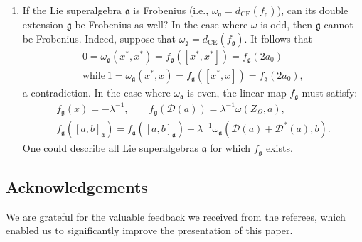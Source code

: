 \documentclass[10pt,a4paper]{amsart}
\numberwithin{equation}{section}
\begin{document}
\begin{enumerate}
 \item[(5)] If the Lie superalgebra $\mathfrak{a}$ is Frobenius (i.e., $\omega_\mathfrak{a}=d_{\text{CE}}(f_\mathfrak{a}) $), can its double extension $\mathfrak{g}$ be Frobenius as well? In the case where $\omega $ is odd, then $\mathfrak{g}$ cannot be Frobenius. Indeed, suppose that $\omega_\mathfrak{g}=d_{\text{CE}}(f_\mathfrak{g})$. It follows that
\begin{gather*}
0=\omega_\mathfrak{g}(x^*, x^*)=f_\mathfrak{g} ([x^*, x^*])= f_\mathfrak{g} (2 a_0) \\ \text{while} \ 1= \omega_\mathfrak{g}(x^*, x)=f_\mathfrak{g} ([x^*, x])=f_\mathfrak{g} (2 a_0),
\end{gather*}
a contradiction. In the case where $\omega_\mathfrak{a}$ is even, the linear map $f_\mathfrak{g}$ must satisfy:
\begin{gather*}
f_\mathfrak{g}(x) = -\lambda^{-1}, \qquad f_\mathfrak{g} ({\mathscr D}(a))= \lambda^{-1} \omega (Z_\Omega, a), \\ f_\mathfrak{g}([a,b]_\mathfrak{a})=f_\mathfrak{a} ([a,b]_\mathfrak{a}) +\lambda^{-1} \omega_\mathfrak{a} ({\mathscr D} (a)+{\mathscr D}^* (a), b).
\end{gather*}
One could describe all Lie superalgebras $\mathfrak{a}$ for which $f_\mathfrak{g}$ exists.
\end{enumerate}

\subsection*{Acknowledgements}
We are grateful for the valuable feedback we received from the referees, which enabled us to significantly improve the presentation of this paper.

\end{document}
